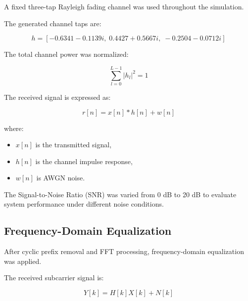 A fixed three-tap Rayleigh fading channel was used throughout the
simulation.

The generated channel taps are:

\begin{equation}
h =
[-0.6341 - 0.1139i,\;
0.4427 + 0.5667i,\;
-0.2504 - 0.0712i]
\end{equation}

The total channel power was normalized:

\begin{equation}
\sum_{l=0}^{L-1}|h_l|^2 = 1
\end{equation}

The received signal is expressed as:

\begin{equation}
r[n]=x[n]*h[n]+w[n]
\end{equation}

where:
\begin{itemize}
    \item $x[n]$ is the transmitted signal,
    \item $h[n]$ is the channel impulse response,
    \item $w[n]$ is AWGN noise.
\end{itemize}

\vspace{0.3cm}


The Signal-to-Noise Ratio (SNR) was varied from 0 dB to 20 dB to evaluate
system performance under different noise conditions.

\subsection{Frequency-Domain Equalization}

After cyclic prefix removal and FFT processing, frequency-domain
equalization was applied.

The received subcarrier signal is:

\begin{equation}
Y[k]=H[k]X[k]+N[k]
\end{equation}

